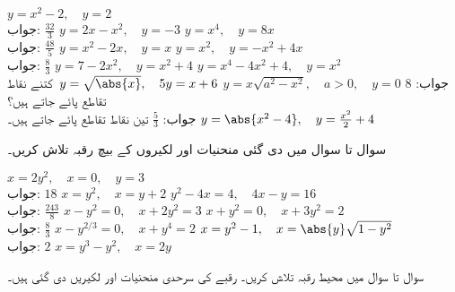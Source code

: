 $y=x^2-2,\quad y=2$\\
جواب:\quad
$\tfrac{32}{3}$
$y=2x-x^2,\quad y=-3$
$y=x^4,\quad y=8x$\\
جواب:\quad
$\tfrac{48}{5}$
$y=x^2-2x,\quad y=x$
$y=x^2,\quad y=-x^2+4x$\\
جواب:\quad
$\tfrac{8}{3}$
$y=7-2x^2,\quad y=x^2+4$
$y=x^4-4x^2+4,\quad y=x^2$\\
جواب:\quad
$8$
$y=x\sqrt{a^2-x^2},\quad a>0,\quad y=0$
$y=\sqrt{\abs{x}},\quad 5y=x+6$\,
کتنے نقاط تقاطع پائے جاتے ہیں؟\\
جواب:\quad
$\tfrac{5}{3}$
تین نقاط تقاطع پائے جاتے ہیں۔
$y=\abs{x^2-4},\quad y=\tfrac{x^2}{2}+4$

سوال  تا سوال  میں دی گئی منحنیات اور لکیروں کے بیچ رقبہ تلاش کریں۔

$x=2y^2,\quad x=0,\quad y=3$\\
جواب:\quad
$18$
$x=y^2,\quad x=y+2$
$y^2-4x=4,\quad 4x-y=16$\\
جواب:\quad
$\tfrac{243}{8}$
$x-y^2=0,\quad x+2y^2=3$
$x+y^2=0,\quad x+3y^2=2$\\
جواب:\quad
$\tfrac{8}{3}$
$x-y^{2/3}=0,\quad x+y^4=2$
$x=y^2-1,\quad x=\abs{y}\sqrt{1-y^2}$\\
جواب:\quad
$2$
$x=y^3-y^2,\quad x=2y$

سوال  تا سوال  میں محیط رقبہ تلاش کریں۔ رقبے کی سرحدی منحنیات اور لکیریں دی گئی ہیں۔

